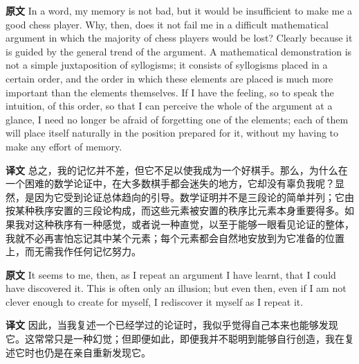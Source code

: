 \documentclass[UTF8,zihao=-4]{ctexart}
\newcommand{\BodyFont}{\fontsize{10.5pt}{15.5pt}\selectfont}
\newcommand{\origlabel}{\textbf{原文}\quad}
\newcommand{\translabel}{\textbf{译文}\quad}
\newenvironment{enblock}{\par\noindent\begingroup\BodyFont\origlabel}{\par\endgroup}
\newenvironment{zhblock}{\par\noindent\begingroup\BodyFont\translabel}{\par\endgroup\vspace{0.35em}}
\begin{document}
\begin{enblock}
In a word, my memory is not bad, but it would be insufficient to make me a good chess player. Why, then, does it not fail me in a difficult mathematical argument in which the majority of chess players would be lost? Clearly because it is guided by the general trend of the argument. A mathematical demonstration is not a simple juxtaposition of syllogisms; it consists of syllogisms placed in a certain order, and the order in which these elements are placed is much more important than the elements themselves. If I have the feeling, so to speak the intuition, of this order, so that I can perceive the whole of the argument at a glance, I need no longer be afraid of forgetting one of the elements; each of them will place itself naturally in the position prepared for it, without my having to make any effort of memory.
\end{enblock}
\begin{zhblock}
总之，我的记忆并不差，但它不足以使我成为一个好棋手。那么，为什么在一个困难的数学论证中，在大多数棋手都会迷失的地方，它却没有辜负我呢？显然，是因为它受到论证总体趋向的引导。数学证明并不是三段论的简单并列；它由按某种秩序安置的三段论构成，而这些元素被安置的秩序比元素本身重要得多。如果我对这种秩序有一种感觉，或者说一种直觉，以至于能够一眼看见论证的整体，我就不必再害怕忘记其中某个元素；每个元素都会自然地安放到为它准备的位置上，而无需我作任何记忆努力。\end{zhblock}

\begin{enblock}
It seems to me, then, as I repeat an argument I have learnt, that I could have discovered it. This is often only an illusion; but even then, even if I am not clever enough to create for myself, I rediscover it myself as I repeat it.
\end{enblock}
\begin{zhblock}
因此，当我复述一个已经学过的论证时，我似乎觉得自己本来也能够发现它。这常常只是一种幻觉；但即便如此，即便我并不聪明到能够自行创造，我在复述它时也仍是在亲自重新发现它。\end{zhblock}
\end{document}
